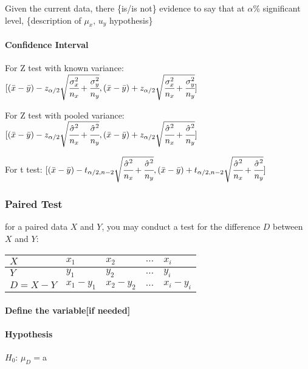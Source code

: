 \documentclass[]{article}
\let\oldparagraph\paragraph
\renewcommand{\paragraph}[1]{\oldparagraph{#1}\mbox{}}
\begin{document}
Given the current data, there \{is/is not\} evidence to say that at
\(\alpha\)\% significant level, \{description of \(\mu_x,\,u_y\)
hypothesis\}

\paragraph{Confidence Interval}\label{header-n200}

For Z test with known variance:
\([(\bar{x} - \bar{y}) - z_{\alpha/2}\sqrt{\cfrac{{\sigma}^2_x}{n_x} + \cfrac{{\sigma}^2_y}{n_y}},(\bar{x} - \bar{y}) + z_{\alpha/2}\sqrt{\cfrac{{\sigma}^2_x}{n_x} + \cfrac{{\sigma}^2_y}{n_y}}]\)

For Z test with pooled variance:
\([(\bar{x} - \bar{y}) - z_{\alpha/2}\sqrt{\cfrac{\hat{\sigma}^2}{n_x} + \cfrac{\hat{\sigma}^2}{n_y}},(\bar{x} - \bar{y}) + z_{\alpha/2}\sqrt{\cfrac{\hat{\sigma}^2}{n_x} + \cfrac{\hat{\sigma}^2}{n_y}}]\)

For t test:
\([(\bar{x} - \bar{y}) - t_{\alpha/2,n-2}\sqrt{\cfrac{\hat{\sigma}^2}{n_x} + \cfrac{\hat{\sigma}^2}{n_y}},(\bar{x} - \bar{y}) + t_{\alpha/2,n-2}\sqrt{\cfrac{\hat{\sigma}^2}{n_x} + \cfrac{\hat{\sigma}^2}{n_y}}]\)

\subsubsection{Paired Test}\label{header-n204}

for a paired data \(X\) and \(Y\), you may conduct a test for the
difference \(D\) between \(X\) and \(Y\):

\begin{longtable}[]{@{}lllll@{}}
\toprule
\(X\) & \(x_1\) & \(x_2\) & \(\dots\) & \(x_i\)\tabularnewline
\midrule
\endhead
\(Y\) & \(y_1\) & \(y_2\) & \(\dots\) & \(y_i\)\tabularnewline
\(D = X-Y\) & \(x_1 - y_1\) & \(x_2 - y_2\) & \(\dots\) &
\(x_i - y_i\)\tabularnewline
\bottomrule
\end{longtable}

\paragraph{Define the variable{[}if needed{]}}\label{header-n225}

\paragraph{Hypothesis}\label{header-n226}

\(H_0\): \(\mu_D= \)a
\end{document}
